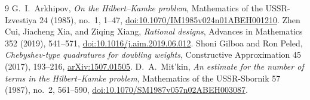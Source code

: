 \documentclass[11pt]{article}
\begin{document}
\begin{thebibliography}{9}
 G.~I.~Arkhipov,
\emph{On the Hilbert--Kamke problem},
Mathematics of the USSR-Izvestiya 24 (1985), no.~1, 1--47,
\href{https://doi.org/10.1070/IM1985v024n01ABEH001210}{doi:10.1070/IM1985v024n01ABEH001210}.
 Zhen Cui, Jiacheng Xia, and Ziqing Xiang,
\emph{Rational designs}, Advances in Mathematics 352 (2019), 541--571,
\href{https://doi.org/10.1016/j.aim.2019.06.012}{doi:10.1016/j.aim.2019.06.012}.
 Shoni Gilboa and Ron Peled,
\emph{Chebyshev-type quadratures for doubling weights},
Constructive Approximation 45 (2017), 193--216,
\href{https://arxiv.org/abs/1507.01505}{arXiv:1507.01505}.
 D.~A.~Mit'kin,
\emph{An estimate for the number of terms in the Hilbert--Kamke problem},
Mathematics of the USSR-Sbornik 57 (1987), no.~2, 561--590,
\href{https://doi.org/10.1070/SM1987v057n02ABEH003087}{doi:10.1070/SM1987v057n02ABEH003087}.
\end{thebibliography}
\end{document}
